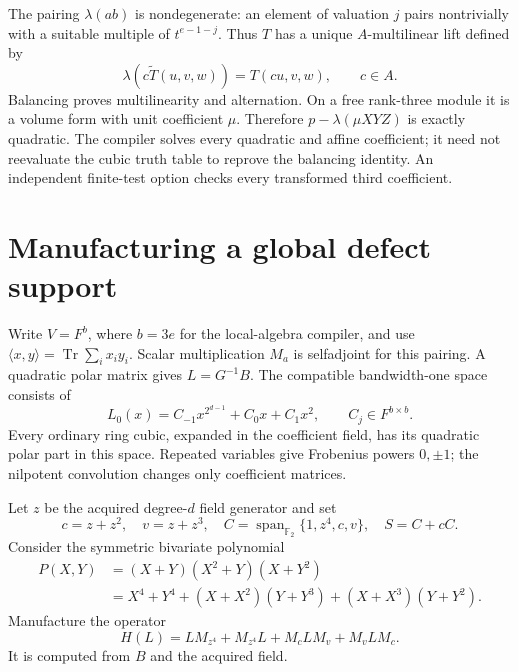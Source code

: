 \documentclass[11pt]{article}
\theoremstyle{remark}\newtheorem{remark}[theorem]{Remark}
\newcommand{\F}{\mathbb F}\newcommand{\Tr}{\operatorname{Tr}}
\newcommand{\Span}{\operatorname{span}}\newcommand{\GL}{\operatorname{GL}}
\begin{document}
The pairing $\lambda(ab)$ is nondegenerate: an element of valuation $j$
pairs nontrivially with a suitable multiple of $t^{e-1-j}$.
Thus $T$ has a unique $A$-multilinear lift defined by
\[
 \lambda(c\widetilde T(u,v,w))=T(cu,v,w),\qquad c\in A.
\]
Balancing proves multilinearity and alternation. On a free rank-three
module it is a volume form with unit coefficient $\mu$.
Therefore $p-\lambda(\mu XYZ)$ is exactly quadratic.
The compiler solves every quadratic and affine coefficient; it need not
reevaluate the cubic truth table to reprove the balancing identity.
An independent finite-test option checks every transformed third coefficient.









\section{Manufacturing a global defect support}\label{sec:sylvester}
Write $V=F^b$, where $b=3e$ for the local-algebra compiler, and use
$\langle x,y\rangle=\Tr\sum_i x_i y_i$. Scalar multiplication $M_a$ is
selfadjoint for this pairing. A quadratic polar matrix gives
$L=G^{-1}B$. The compatible bandwidth-one space consists of
\[
 L_0(x)=C_{-1}x^{2^{d-1}}+C_0x+C_1x^2,\qquad C_j\in F^{b\times b}.
\]
Every ordinary ring cubic, expanded in the coefficient field, has its
quadratic polar part in this space. Repeated variables give Frobenius
powers $0,\pm1$; the nilpotent convolution changes only coefficient matrices.

Let $z$ be the acquired degree-$d$ field generator and set
\[
 c=z+z^2,\quad v=z+z^3,\quad
 C=\Span_{\F_2}\{1,z^4,c,v\},\quad S=C+cC.
\]
Consider the symmetric bivariate polynomial
\begin{align*}
 P(X,Y)&=(X+Y)(X^2+Y)(X+Y^2)\\
 &=X^4+Y^4+(X+X^2)(Y+Y^3)+(X+X^3)(Y+Y^2).
\end{align*}
Manufacture the operator
\begin{equation}\label{eq:selfadjoint}
 H(L)=LM_{z^4}+M_{z^4}L+M_cLM_v+M_vLM_c.
\end{equation}
It is computed from $B$ and the acquired field.
\end{document}
